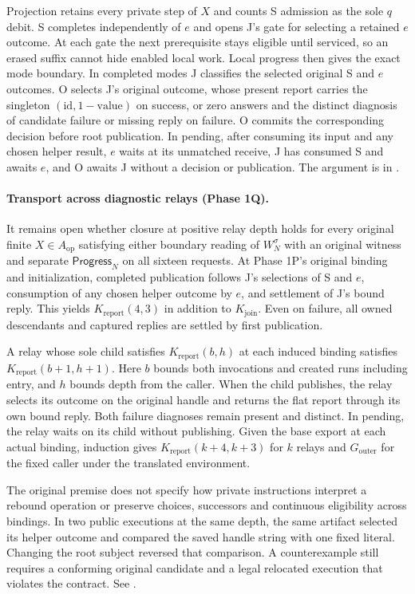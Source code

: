 \documentclass[11pt,a4paper]{article}
\theoremstyle{definition}
\theoremstyle{remark}
\begin{document}
Projection retains every private step of $X$ and counts S admission as the sole $q$ debit. S completes independently of $e$ and opens J's gate for selecting a retained $e$ outcome. At each gate the next prerequisite stays eligible until serviced, so an erased suffix cannot hide enabled local work. Local progress then gives the exact mode boundary. In completed modes J classifies the selected original S and $e$ outcomes. O selects J's original outcome, whose present report carries the singleton $(\mathrm{id},1-\mathrm{value})$ on success, or zero answers and the distinct diagnosis of candidate failure or missing reply on failure. O commits the corresponding decision before root publication. In pending, after consuming its input and any chosen helper result, $e$ waits at its unmatched receive, J has consumed S and awaits $e$, and O awaits J without a decision or publication. The argument is in .

\paragraph{Transport across diagnostic relays (Phase 1Q).} It remains open whether closure at positive relay depth holds for every original finite $X\in A_{\mathrm{op}}$ satisfying either boundary reading of $W_N^\sigma$ with an original witness and separate $\mathsf{Progress}_N$ on all sixteen requests. At Phase 1P's original binding and initialization, completed publication follows J's selections of S and $e$, consumption of any chosen helper outcome by $e$, and settlement of J's bound reply. This yields $K_{\mathrm{report}}(4,3)$ in addition to $K_{\mathrm{join}}$. Even on failure, all owned descendants and captured replies are settled by first publication.

A relay whose sole child satisfies $K_{\mathrm{report}}(b,h)$ at each induced binding satisfies $K_{\mathrm{report}}(b+1,h+1)$. Here $b$ bounds both invocations and created runs including entry, and $h$ bounds depth from the caller. When the child publishes, the relay selects its outcome on the original handle and returns the flat report through its own bound reply. Both failure diagnoses remain present and distinct. In pending, the relay waits on its child without publishing. Given the base export at each actual binding, induction gives $K_{\mathrm{report}}(k+4,k+3)$ for $k$ relays and $G_{\mathrm{outer}}$ for the fixed caller under the translated environment.

The original premise does not specify how private instructions interpret a rebound operation or preserve choices, successors and continuous eligibility across bindings. In two public executions at the same depth, the same artifact selected its helper outcome and compared the saved handle string with one fixed literal. Changing the root subject reversed that comparison. A counterexample still requires a conforming original candidate and a legal relocated execution that violates the contract. See .
\end{document}
